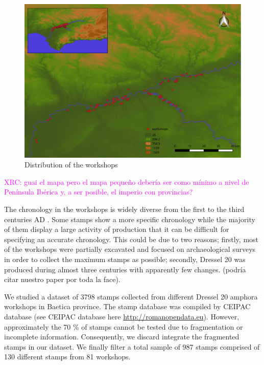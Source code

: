 \documentclass[review]{elsarticle}
\newcommand{\memo}[2]{\textcolor{#1}{#2}}
\newcommand{\xavi}[1]{\memo{magenta}{XRC: #1\\}}
\begin{document}
\begin{figure}[htp]
	\centering
\includegraphics[width=\linewidth]{figs/workshop}
\caption{Distribution of the workshops}
\label{workshop}
\end{figure} 

\xavi{guai el mapa pero el mapa pequeño debería ser como mínimo a nivel de Península Ibérica y, a ser posible, el imperio con provincias?}

The chronology in the workshops is widely diverse from the first to the third centuries AD \citep{millet_anforas_1998,rodriguez_baetican_1998,chic2005comercio}. Some stamps show a more specific chronology while the majority of them display a large activity of production that it can be difficult for specifying an accurate chronology. This could be due to two reasons; firstly, most of the workshops were partially excavated and focused on archaeological surveys in order to collect the maximum stamps as possible; secondly, Dressel 20 was produced during almost three centuries with apparently few changes. (podría citar nuestro paper por toda la face).
 
We studied a dataset of 3798 stamps collected from different Dressel 20 amphora workshops in Baetica province. The stamp database was compiled by CEIPAC database \citep{remesal_centro_2015} (see CEIPAC database here \url{http://romanopendata.eu}). However, approximately the 70 \% of stamps cannot be tested due to fragmentation or incomplete information. Consequently, we discard integrate the fragmented stamps in our dataset. We finally filter a total sample of 987 stamps comprised of 130 different stamps from 81 workshops. 
\end{document}
